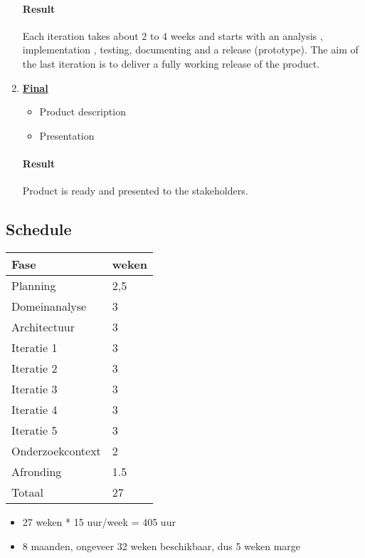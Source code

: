 \begin{enumerate}
	\paragraph{Result}
	Each iteration takes about 2 to 4 weeks and starts with an analysis , implementation , testing, documenting and a release (prototype). The aim of the last iteration is to deliver a fully working release of the product.
	
	\item \underline{\textbf{Final}}
	\begin{itemize}
		\item Product description
		\item Presentation
	\end{itemize}
	\paragraph{Result}
	Product is ready and presented to the stakeholders.
\end{enumerate}

\subsection{Schedule}
 

\begin{tabular}{ll}\hline
{\bf Fase}    & {\bf weken}\\\hline
Planning             & 2,5 \\

Domeinanalyse        & 3 \\
Architectuur         & 3 \\

Iteratie 1           & 3 \\
Iteratie 2           & 3 \\
Iteratie 3           & 3 \\
Iteratie 4           & 3 \\
Iteratie 5           & 3 \\

Onderzoekcontext     &	2 \\

Afronding	     & 1.5 \\
\hline
Totaal               & 27 \\
\end{tabular}

\begin{itemize}
 \item 27 weken * 15 uur/week = 405 uur
 \item 8 maanden, ongeveer 32 weken beschikbaar, dus 5 weken marge
\end{itemize}



